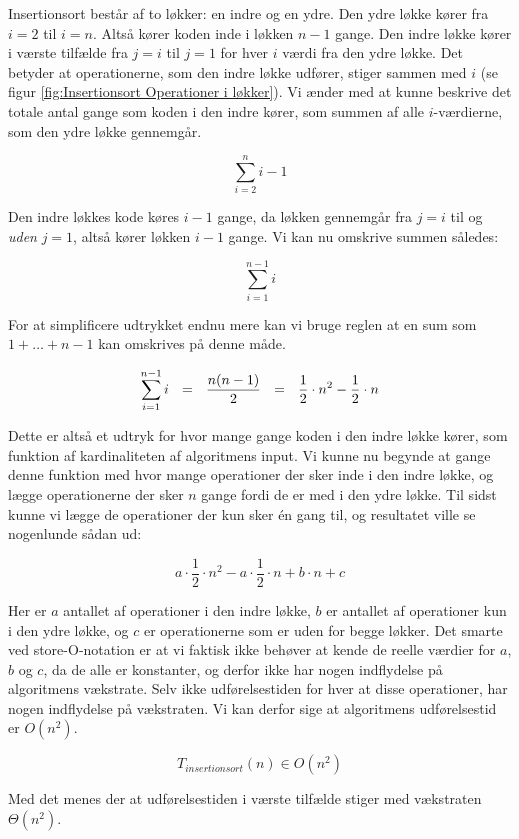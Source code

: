 Insertionsort består af to løkker: en indre og en ydre. Den ydre løkke kører fra $i = 2$ til $i = n$. Altså kører koden inde i løkken $n - 1$ gange. Den indre løkke kører i værste tilfælde fra $j = i$ til $j = 1$ for hver $i$ værdi fra den ydre løkke. Det betyder at operationerne, som den indre løkke udfører, stiger sammen med $i$ (se figur \ref{fig:Insertionsort Operationer i løkker}). Vi ænder med at kunne beskrive det totale antal gange som koden i den indre kører, som summen af alle $i$-værdierne, som den ydre løkke gennemgår.

$$\sum_{i=2}^{n}i-1$$

Den indre løkkes kode køres $i-1$ gange, da løkken gennemgår fra $j=i$ til og \emph{uden} $j=1$, altså kører løkken $i-1$ gange. Vi kan nu omskrive summen således:

$$\sum_{i=1}^{n-1}i$$

For at simplificere udtrykket endnu mere kan vi bruge reglen at en sum som $1 + \dots + n -1$ kan omskrives på denne måde. \red{[Bevis??]}

$$\sum_{i=1}^{n-1}i \:\:\:=\:\:\: \frac{n(n-1)}{2} \:\:\:=\:\:\: \frac{1}{2}\cdot  n^2 - \frac{1}{2}\cdot  n$$

Dette er altså et udtryk for hvor mange gange koden i den indre løkke kører, som funktion af kardinaliteten af algoritmens input. Vi kunne nu begynde at gange denne funktion med hvor mange operationer der sker inde i den indre løkke, og lægge operationerne der sker $n$ gange fordi de er med i den ydre løkke. Til sidst kunne vi lægge de operationer der kun sker én gang til, og resultatet ville se nogenlunde sådan ud:

$$a \cdot \frac{1}{2} \cdot n^2 - a \cdot \frac{1}{2} \cdot n + b \cdot n + c$$

Her er $a$ antallet af operationer i den indre løkke, $b$ er antallet af operationer kun i den ydre løkke, og $c$ er operationerne som er uden for begge løkker. Det smarte ved store-O-notation er at vi faktisk ikke behøver at kende de reelle værdier for $a$, $b$ og $c$, da de alle er konstanter, og derfor ikke har nogen indflydelse på algoritmens vækstrate. Selv ikke udførelsestiden for hver at disse operationer, har nogen indflydelse på vækstraten. Vi kan derfor sige at algoritmens udførelsestid er $O(n^2)$.

$$T_{insertionsort}(n) \in O(n^2)$$

Med det menes der at udførelsestiden i værste tilfælde stiger med vækstraten $\Theta (n^2)$.


